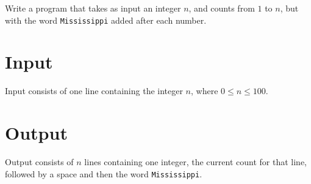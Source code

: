 
Write a program that takes as input an integer $n$, and counts from $1$ to $n$, but with the word \texttt{Mississippi} added after each number.

\section*{Input}

Input consists of one line containing the integer $n$, where $0 \leq n \leq 100$.

\section*{Output}

Output consists of $n$ lines containing one integer, 
the current count for that line, followed by a space and then the word \texttt{Mississippi}.

